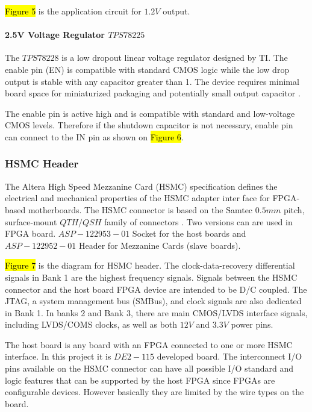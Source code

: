 \hl{Figure 5} is the application circuit for $1.2V$ output.



\paragraph{2.5V Voltage Regulator \texorpdfstring{$TPS78225$}{TPS78225}}
The $TPS78228$ is a low dropout linear voltage regulator designed by TI. The enable pin (EN) is compatible with standard CMOS logic while the low drop output is stable with any capacitor greater than 1. The device requires minimal board space for miniaturized packaging and potentially small output capacitor \citep{TI:2008:TPS782}.

The enable pin is active high and is compatible with standard and low-voltage CMOS levels. Therefore if the shutdown capacitor is not necessary, enable pin can connect to the IN pin as shown on \hl{Figure 6}.


\subsubsection{HSMC Header}
The Altera High Speed Mezzanine Card (HSMC) specification defines the electrical and mechanical properties of the HSMC adapter inter face for FPGA-based motherboards. The HSMC connector is based on the Samtec $0.5mm$ pitch, surface-mount $QTH/QSH$ family of connectors \citep{Altera:2009:HSMCspec}. Two versions can are used in FPGA board. $ASP-122953-01$ Socket for the host boards and $ASP-122952-01$ Header for Mezzanine Cards (slave boards).

\hl{Figure 7} is the diagram for HSMC header. The clock-data-recovery differential signals in Bank 1 are the highest frequency signals. Signals between the HSMC connector and the host board FPGA device are intended to be D/C coupled. The JTAG, a system management bus (SMBus), and clock signals are also dedicated in Bank 1. In banks 2 and Bank 3, there are main CMOS/LVDS interface signals, including LVDS/COMS clocks, as well as both $12V$ and $3.3V$ power pins.

The host board is any board with an FPGA connected to one or more HSMC interface. In this project it is $DE2-115$ developed board. The interconnect I/O pins available on the HSMC connector can have all possible I/O standard and logic features that can be supported by the host FPGA since FPGAs are configurable devices. However basically they are limited by the wire types on the board.

